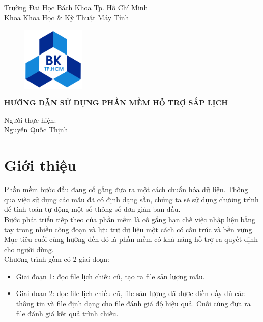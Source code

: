 \documentclass[11pt]{article}
\begin{document}
	\begin{titlepage}		
		\begin{flushleft}
		\noindent Trường Đai Học Bách Khoa Tp. Hồ Chí Minh\\
		Khoa Khoa Học \& Kỹ Thuật Máy Tính\\
		\end{flushleft}
		
		\vspace{1cm}
		
		\begin{figure}[h!]
		\begin{center}
		\includegraphics[width=30mm]{hcmut.png}
		\end{center}
		\end{figure}
		
		\vspace{1cm}
		
		
		\begin{center}
	
		\textbf{{\Huge HƯỚNG DẪN SỬ DỤNG PHẦN MỀM HỖ TRỢ SẮP LỊCH }}\\
	
		\end{center}
		
		\vspace{4cm}
	
		\begin{flushright}
			Người thực hiện:\\
			Nguyễn Quốc Thịnh
		\end{flushright}
	\end{titlepage}
	\tableofcontents 
	\newpage
	\section{Giới thiệu}
	Phần mềm bước đầu đang cố gắng đưa ra một cách chuẩn hóa dữ liệu. Thông qua việc sử dụng các mẫu đã có định dạng sẵn, chúng ta sẽ sử dụng chương trình để tính toán tự động một số thông số đơn giản ban đầu.\\
	Bước phát triển tiếp theo của phần mềm là cố gắng hạn chế việc nhập liệu bằng tay trong nhiều công đoạn và lưu trữ dữ liệu một cách có cấu trúc và bền vững.\\
	Mục tiêu cuối cùng hướng đến đó là phần mềm có khả năng hỗ trợ ra quyết định cho người dùng.\\
	Chương trình gồm có 2 giai đoạn:
	\begin{itemize}
		\item Giai đoạn 1: đọc file lịch chiếu cũ, tạo ra file sản lượng mẫu.
		\item Giai đoạn 2: đọc file lịch chiếu cũ, file sản lượng đã được điền đầy đủ các thông tin và file định dạng cho file đánh giá độ hiệu quả. Cuối cùng đưa ra file đánh giá kết quả trình chiếu.
	\end{itemize}	
\end{document}
